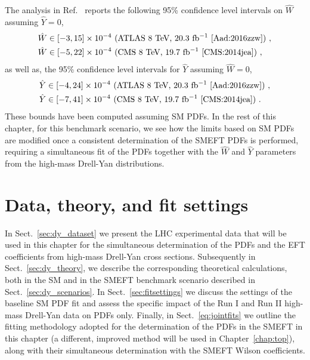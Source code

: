 \documentclass[withindex,glossary]{cam-thesis}
\begin{document}
The analysis in Ref.~\cite{Farina:2016rws} reports the following 95\% confidence level intervals on $\hat{W}$ assuming $\hat{Y}=0$,
\begin{equation}
\begin{split}
\hat W &\in \left[ - 3, 15 \right]\times 10^{-4}~\textrm{(ATLAS 8 TeV, 20.3 fb$^{-1}$~\cite{Aad:2016zzw})}~,\\
\hat W &\in \left[ - 5, 22 \right]\times 10^{-4}~\textrm{(CMS 8 TeV, 19.7 fb$^{-1}$~\cite{CMS:2014jea})}~,
\end{split}
\end{equation} 
as well as, the 95\% confidence level intervals for $\hat{Y}$ assuming $\hat{W}=0$,
\begin{equation}
\begin{split}
\hat Y &\in \left[ - 4, 24 \right]\times 10^{-4}~\textrm{(ATLAS 8 TeV, 20.3 fb$^{-1}$~\cite{Aad:2016zzw})}~,\\
\hat Y &\in \left[ - 7, 41 \right]\times 10^{-4}~\textrm{(CMS 8 TeV, 19.7 fb$^{-1}$~\cite{CMS:2014jea})}~.
\end{split}
\end{equation}
These bounds have been computed assuming SM PDFs. In the rest of this chapter,
for this benchmark scenario, we see how the limits based on SM PDFs
are modified once a consistent determination of the SMEFT PDFs is
performed, requiring a simultaneous fit of the PDFs together with the
$\hat{W}$ and $\hat{Y}$ parameters from the high-mass Drell-Yan distributions. 


\section{Data, theory, and fit settings}
\label{sec:dy_data}

In Sect.~\ref{sec:dy_dataset} we present the LHC experimental data  that will be used in this chapter
for the simultaneous determination of the PDFs and
the EFT coefficients from high-mass Drell-Yan cross sections.
%
Subsequently in Sect.~\ref{sec:dy_theory}, we describe the corresponding theoretical calculations, both in the SM
and in the SMEFT benchmark scenario described in Sect.~\ref{sec:dy_scenarios}.
%
In Sect.~\ref{sec:fitsettings} we  discuss the settings of the baseline SM PDF fit and assess the
specific impact of the Run I and Run II high-mass Drell-Yan data on PDFs only.
%
Finally, in Sect.~\ref{eq:jointfits} we outline the fitting methodology adopted for
the determination of the PDFs in the SMEFT in this chapter (a different, improved method will be
used in Chapter~\ref{chap:top}), along with their
simultaneous determination with the SMEFT Wilson coefficients.
\end{document}
